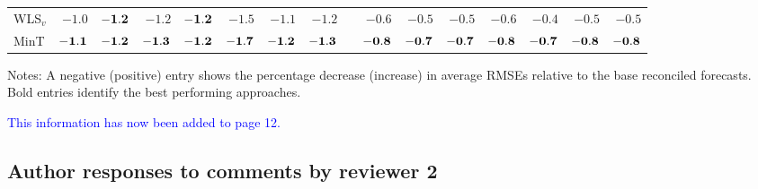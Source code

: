 \documentclass[10pt,a4paper]{article}
\begin{document}
\begin{enumerate}
\begin{table*}[!htb]
\begin{threeparttable}
\begin{tabular}{lrrrrrrrrrrrrrrr}
  WLS$_v$ & $-1.0$ & $\bf{ -1.2}$ & $-1.2$ & $\bf{ -1.2}$ & $-1.5$ & $-1.1$ & $-1.2$ & & $-0.6$ & $-0.5$ & $-0.5$ & $-0.6$ & $-0.4$ & $-0.5$ & $-0.5$ \\
  MinT & $\bf{ -1.1}$ & $\bf{ -1.2}$ & $\bf{ -1.3}$ & $\bf{ -1.2}$ & $\bf{ -1.7}$ & $\bf{ -1.2}$ & $\bf{ -1.3}$ & & $\bf{ -0.8}$ & $\bf{ -0.7}$ & $\bf{ -0.7}$ & $\bf{ -0.8}$ & $\bf{ -0.7}$ & $\bf{ -0.8}$ & $\bf{ -0.8}$ \\
  \bottomrule
  \end{tabular}
  \begin{tablenotes}
  \item Notes: A negative (positive) entry shows the percentage decrease (increase) in average RMSEs relative to the base reconciled forecasts. Bold entries identify the best performing approaches.
  \end{tablenotes}
  \end{threeparttable}
  \end{table*}

  \textcolor{blue}{This information has now been added to page 12.}
\end{enumerate}

\clearpage

\subsection*{Author responses to comments by reviewer 2}
\end{document}
